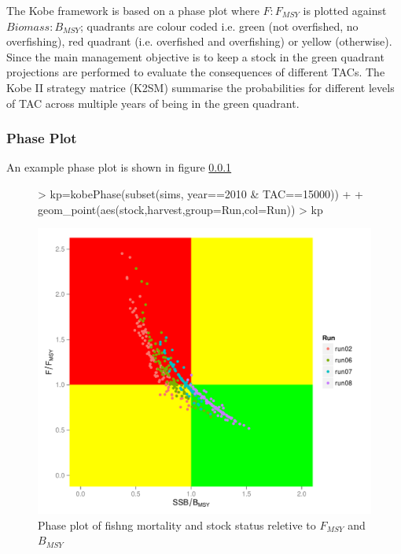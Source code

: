 \documentclass[shortnames,nojss,article]{jss}
\begin{document}
The Kobe framework is based on a phase plot where $F : F_{MSY}$ is plotted against $Biomass : B_{MSY}$; quadrants are colour coded i.e.
green (not overfished, no overfishing), red quadrant (i.e. overfished and overfishing) or yellow (otherwise).
Since the main management objective is to keep a stock in the green quadrant projections are performed to evaluate the consequences of different TACs. 
The Kobe II strategy matrice (K2SM) summarise the probabilities for different levels of TAC across multiple years of being in the green quadrant.

\subsubsection{Phase Plot}

An example phase plot is shown in figure \ref{}
\begin{figure}\begin{center}
\begin{Schunk}
\begin{Sinput}
> kp=kobePhase(subset(sims, year==2010 & TAC==15000)) +
+          geom_point(aes(stock,harvest,group=Run,col=Run)) 
> kp
\end{Sinput}
\end{Schunk}
\includegraphics{kobe-015}
\caption{Phase plot of fishng mortality and stock status reletive to $F_{MSY}$ and  $B_{MSY}$}
\label{fig:1st}\end{center}\end{figure}
\end{document}
